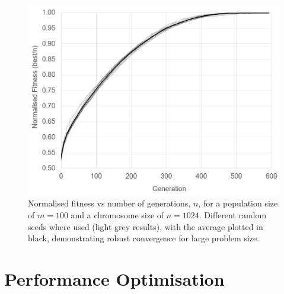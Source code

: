 \documentclass{article}
\begin{document}
\begin{figure}[H]
\centering
\includegraphics[scale=0.6]{normfit.png}
\caption{Normalised fitness vs number of generations, \(n\), for a population size of \(m=100\) and a chromosome size of \(n=1024\). Different random seeds where used (light grey results), with the average  plotted in black, demonstrating robust convergence for large problem size.}
\end{figure}

\newpage
\section{Performance Optimisation}
\end{document}
